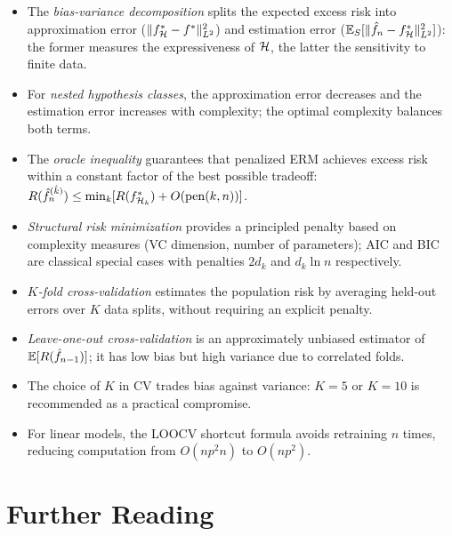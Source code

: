 \documentclass[11pt,a4paper]{article}
\begin{document}
\begin{itemize}
    \item The \emph{bias-variance decomposition} splits the expected
    excess risk into approximation error
    ($\|f_{\mathcal{H}}^* - f^*\|_{L^2}^2$) and estimation error
    ($\mathbb{E}_S[\|\hat{f}_n - f_{\mathcal{H}}^*\|_{L^2}^2]$): the former
    measures the expressiveness of $\mathcal{H}$, the latter the
    sensitivity to finite data.
    \item For \emph{nested hypothesis classes}, the approximation
    error decreases and the estimation error increases with
    complexity; the optimal complexity balances both terms.
    \item The \emph{oracle inequality} guarantees that penalized ERM
    achieves excess risk within a constant factor of the best
    possible tradeoff: $R(\hat{f}_n^{(\hat{k})}) \leq
    \min_k [R(f_{\mathcal{H}_k}^*) + O(\mathrm{pen}(k, n))]$.
    \item \emph{Structural risk minimization} provides a principled
    penalty based on complexity measures (VC dimension, number of
    parameters); AIC and BIC are classical special cases with
    penalties $2d_k$ and $d_k \ln n$ respectively.
    \item \emph{$K$-fold cross-validation} estimates the population
    risk by averaging held-out errors over $K$ data splits, without
    requiring an explicit penalty.
    \item \emph{Leave-one-out cross-validation} is an approximately
    unbiased estimator of $\mathbb{E}[R(\hat{f}_{n-1})]$; it has low
    bias but high variance due to correlated folds.
    \item The choice of $K$ in CV trades bias against variance:
    $K = 5$ or $K = 10$ is recommended as a practical compromise.
    \item For linear models, the LOOCV shortcut formula avoids
    retraining $n$ times, reducing computation from $O(np^2 n)$ to
    $O(np^2)$.
\end{itemize}


\section{Further Reading}
\label{sec:further_reading}
\end{document}
